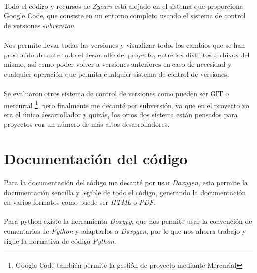 \paragraph{}
Todo el código y recursos de \emph{Zycars} está alojado en el sistema que proporciona Google Code, que consiste en un entorno completo
usando el sistema de control de versiones \emph{subversion}.

\paragraph{}
Nos permite llevar todas las versiones y visualizar todos los cambios que se han producido durante todo el desarrollo del proyecto,
entre los distintos archivos del mismo, así como poder volver a versiones anteriores en caso de necesidad y cualquier operación
que permita cualquier sistema de control de versiones.

\paragraph{}
Se evaluaron otros sistema de control de versiones como pueden ser GIT o mercurial \footnote{Google Code también permite la gestión
de proyecto mediante Mercurial}, pero finalmente me decanté por subversión, ya
que en el proyecto yo era el único desarrollador y 
quizás, los otros dos sistema están pensados para proyectos con un número de más altos
desarrolladores.

\section{Documentación del código}

\paragraph{}
Para la documentación del código me decanté por usar \emph{Doxygen}, esta permite la documentación sencilla y legible de todo el 
código, generando la documentación en varios formatos como puede ser \emph{HTML} o \emph{PDF}.

\paragraph{}
Para python existe la herramienta \emph{Doxypy}, que nos permite usar la convención de comentarios de \emph{Python} y adaptarlos a
\emph{Doxygen}, por lo que nos ahorra trabajo y sigue la normativa de código \emph{Python}.

